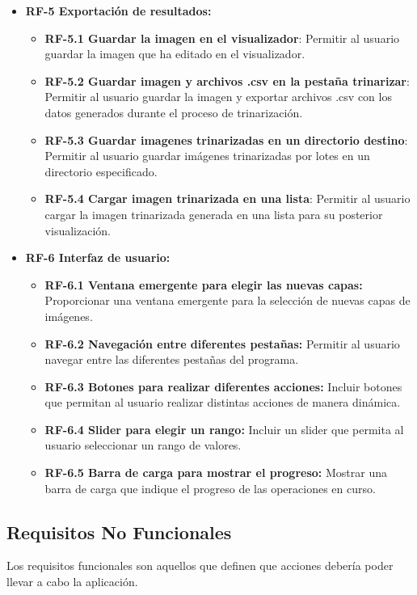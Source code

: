 \begin{itemize}
	\item \textbf{RF-5 Exportación de resultados:}
    	\begin{itemize}
    		\item \textbf{RF-5.1 Guardar la imagen en el visualizador}: Permitir al usuario guardar la imagen que ha editado en el visualizador.
                \item \textbf{RF-5.2 Guardar imagen y archivos .csv en la pestaña trinarizar}: Permitir al usuario guardar la imagen y exportar archivos .csv con los datos generados durante el proceso de trinarización.
                \item \textbf{RF-5.3 Guardar imagenes trinarizadas en un directorio destino}: Permitir al usuario guardar imágenes trinarizadas por lotes en un directorio especificado.
                \item \textbf{RF-5.4 Cargar imagen trinarizada en una lista}:  Permitir al usuario cargar la imagen trinarizada generada en una lista para su posterior visualización.
    	\end{itemize}
          
	\item \textbf{RF-6 Interfaz de usuario:}
    	\begin{itemize}
                \item \textbf{RF-6.1 Ventana emergente para elegir las nuevas capas:} Proporcionar una ventana emergente para la selección de nuevas capas de imágenes.
                \item \textbf{RF-6.2 Navegación entre diferentes pestañas:} Permitir al usuario navegar entre las diferentes pestañas del programa.
                \item \textbf{RF-6.3 Botones para realizar diferentes acciones:} Incluir botones que permitan al usuario realizar distintas acciones de manera dinámica.
                \item \textbf{RF-6.4 Slider para elegir un rango:} Incluir un slider que permita al usuario seleccionar un rango de valores.
                \item \textbf{RF-6.5 Barra de carga para mostrar el progreso:} Mostrar una barra de carga que indique el progreso de las operaciones en curso.
    	\end{itemize}

     
\end{itemize}

\subsection{Requisitos No Funcionales}
Los requisitos funcionales son aquellos que definen que acciones debería poder llevar a cabo la aplicación.

